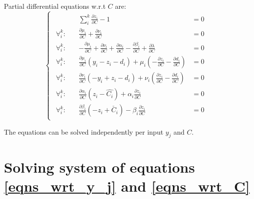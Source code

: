 \documentclass[11 pt]{article}
\begin{document}
Partial differential equations w.r.t $C$ are:
\begin{equation}\label{eqns_wrt_C}
    \begin{cases}
        \begin{aligned}
            & \sum_i^k \frac{\partial z_i}{\partial C} - 1 & = 0 \\
            
            \forall_i^k : \quad & \frac{\partial\mu_i}{\partial C} + \frac{\partial \nu_i}{\partial C} & = 0\\
            
            \forall_i^k : \quad & -\frac{\partial \mu_i}{\partial C} + \frac{\partial \nu_i}{\partial C} + \frac{\partial \alpha_i}{\partial C} - \frac{\partial \beta_i}{\partial C} + \frac{\partial \lambda}{\partial C} & = 0 \\
            
            \forall_i^k : \quad & \frac{\partial \mu_i}{\partial C}(y_i - z_i - d_i) + \mu_i (- \frac{\partial z_i}{\partial C} - \frac{\partial d_i}{\partial C}) & = 0 \\
            
            \forall_i^k : \quad & \frac{\partial \nu_i}{\partial C}(- y_i + z_i - d_i) + \nu_i(\frac{\partial z_i}{\partial C} - \frac{\partial d_i}{\partial C}) & = 0 \\
            
            \forall_i^k : \quad & \frac{\partial \alpha_i}{\partial C}(z_i - \hat{C_i}) + \alpha_i \frac{\partial z_i}{\partial C} & = 0 \\
            
            \forall_i^k : \quad & \frac{\partial \beta_i}{\partial C}(-z_i + \check{C_i}) - \beta_i \frac{\partial z_i}{\partial C}& = 0
        \end{aligned}
    \end{cases}
\end{equation}

The equations can be solved independently per input $y_j$ and $C$.


\section{Solving system of equations \ref{eqns_wrt_y_j} and \ref{eqns_wrt_C}}
\end{document}

